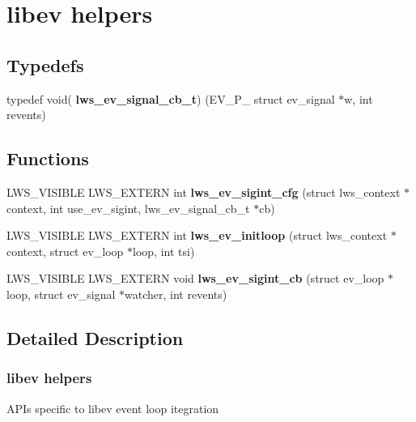 \hypertarget{group__ev}{}\section{libev helpers}
\label{group__ev}
\subsection*{Typedefs}
\begin{DoxyCompactItemize}
\item 
typedef void( {\bfseries lws\+\_\+ev\+\_\+signal\+\_\+cb\+\_\+t}) (E\+V\+\_\+\+P\+\_\+ struct ev\+\_\+signal $\ast$w, int revents)\hypertarget{group__ev_ga3b0ffd4d2b4fa791c0fd75353a330208}{}\label{group__ev_ga3b0ffd4d2b4fa791c0fd75353a330208}

\end{DoxyCompactItemize}
\subsection*{Functions}
\begin{DoxyCompactItemize}
\item 
L\+W\+S\+\_\+\+V\+I\+S\+I\+B\+LE L\+W\+S\+\_\+\+E\+X\+T\+E\+RN int {\bfseries lws\+\_\+ev\+\_\+sigint\+\_\+cfg} (struct lws\+\_\+context $\ast$context, int use\+\_\+ev\+\_\+sigint, lws\+\_\+ev\+\_\+signal\+\_\+cb\+\_\+t $\ast$cb)\hypertarget{group__ev_ga5caf14a420a2a0bd687a1fc952f8d64e}{}\label{group__ev_ga5caf14a420a2a0bd687a1fc952f8d64e}

\item 
L\+W\+S\+\_\+\+V\+I\+S\+I\+B\+LE L\+W\+S\+\_\+\+E\+X\+T\+E\+RN int {\bfseries lws\+\_\+ev\+\_\+initloop} (struct lws\+\_\+context $\ast$context, struct ev\+\_\+loop $\ast$loop, int tsi)\hypertarget{group__ev_ga3fdd23ded693b21853356dc9eaef5ccc}{}\label{group__ev_ga3fdd23ded693b21853356dc9eaef5ccc}

\item 
L\+W\+S\+\_\+\+V\+I\+S\+I\+B\+LE L\+W\+S\+\_\+\+E\+X\+T\+E\+RN void {\bfseries lws\+\_\+ev\+\_\+sigint\+\_\+cb} (struct ev\+\_\+loop $\ast$loop, struct ev\+\_\+signal $\ast$watcher, int revents)\hypertarget{group__ev_gaabfc0880d6a98133550c61aa01ef3563}{}\label{group__ev_gaabfc0880d6a98133550c61aa01ef3563}

\end{DoxyCompactItemize}


\subsection{Detailed Description}
\subsubsection*{libev helpers}

A\+P\+Is specific to libev event loop itegration 